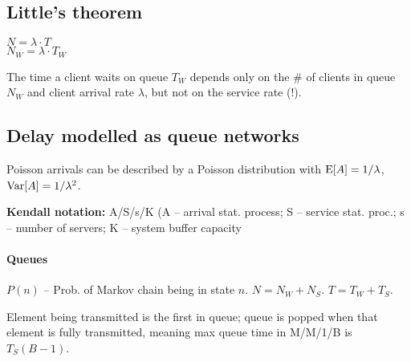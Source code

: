 \documentclass{form}
\begin{document}
\begin{minipage}{5.5em} \subsection*{Little's theorem} \end{minipage}
\begin{minipage}{7.0em}
    $N = \lambda \cdot T$ \\
    $N_W = \lambda \cdot T_W$
\end{minipage}
\begin{minipage}{48.5em}
    The time a client waits on queue $T_W$ depends only on the \# of clients in queue $N_W$ and client arrival rate $\lambda$, but not on the service rate (!).
\end{minipage}

\begin{minipage}{0.289\textwidth}
    \subsection*{Delay modelled as queue networks}
    Poisson arrivals can be described by a Poisson distribution with $\operatorname{E}[A]=1/\lambda$, $\operatorname{Var}[A]=1/\lambda^2$.

    \textbf{Kendall notation:} A/S/s/K (A -- arrival stat. process; S -- service stat. proc.; s -- number of servers; K -- system buffer capacity

    \paragraph{Queues}
    $P(n)$ -- Prob. of Markov chain being in state $n$.
    $N = N_W + N_S$.
    $T = T_W + T_S$.

    Element being transmitted is the first in queue; queue is popped when that element is fully transmitted, meaning max queue time in M/M/1/B is $T_S (B-1)$.

\end{minipage}
\end{document}
